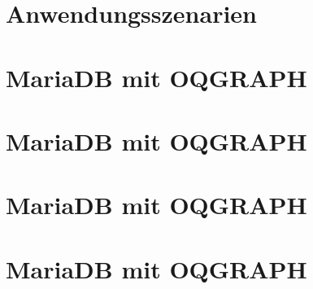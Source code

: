 \documentclass[12pt, bibliography=totoc, a4paper, abstractoff, numbers=noenddot]{scrreprt}
\begin{document}








\tableofcontents
\newpage



\setcounter{secnumdepth}{4}

\setcounter{chapter}{1}
\setcounter{section}{0}
\section{Anwendungsszenarien}%


\newpage
\setcounter{chapter}{2}
\setcounter{section}{0}
\section{MariaDB mit OQGRAPH} %


\newpage
\setcounter{chapter}{3}
\setcounter{section}{0}
\section{MariaDB mit OQGRAPH}%


\newpage
\setcounter{chapter}{4}
\setcounter{section}{0}
\section{MariaDB mit OQGRAPH}%


\newpage
\setcounter{chapter}{5}
\setcounter{section}{0}
\section{MariaDB mit OQGRAPH}%


\newpage


\end{document}
